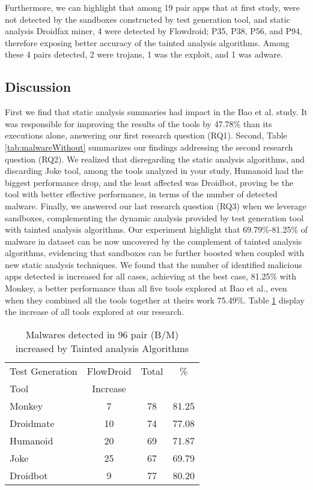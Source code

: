 Furthermore, we can highlight that among 19 pair apps that at first study, were not detected by the sandboxes constructed by test generation tool, and static analysis Droidfax miner, 4 were detected by Flowdroid; P35, P38, P56, and P94, therefore exposing better accuracy of the tainted analysis algorithms. Among these 4 pairs detected, 2 were trojans, 1 was the exploit, and 1 was adware.

\subsection{Discussion}\label{sec:discussion}

First we find that static analysis summaries had impact in the Bao et al. study. It was responsible for improving the results of the tools by 47.78\% than its executions alone, answering our first research question (RQ1). Second, Table \ref{tab:malwareWithout} summarizes our findings addressing the second research question (RQ2). We realized that disregarding the static analysis algorithms, and discarding Joke tool, among the tools analyzed in your study, Humanoid had the biggest performance drop, and the least affected was Droidbot, proving be the tool with better effective performance, in terms of the number of detected malware. Finally, we answered our last research question (RQ3) when we leverage sandboxes, complementing the dynamic analysis provided by test generation tool with tainted analysis algorithms. Our experiment highlight that 69.79\%-81.25\% of malware in dataset can be now uncovered by the complement of tainted analysis algorithms, evidencing that 
sandboxes can be further boosted when coupled with new static analysis techniques. We found that the number of identified malicious apps detected is increased for all cases, achieving at the best case, 81.25\% with Monkey, a better performance than all five tools explored at Bao et al., even when they combined all the tools together at theirs work 75.49\%. Table \ref{tab:tanted} display the increase of all tools explored at our research.

\begin{table}[ht]
\centering
\begin{tabular}{lccc}\toprule
 Test Generation & FlowDroid & Total & \%\\
 Tool & Increase  &  & \\ \midrule
 Monkey & 7 & 78 & 81.25\\
 Droidmate & 10 &  74 & 77.08 \\
 Humanoid & 20 & 69 & 71.87  \\
 Joke & 25 & 67 & 69.79 \\
 Droidbot & 9 & 77 & 80.20  \\\midrule
 
\end{tabular} 
\caption{Malwares detected in 96 pair (B/M) increased by Tainted analysis Algorithms}
\label{tab:tanted}
\end{table}



